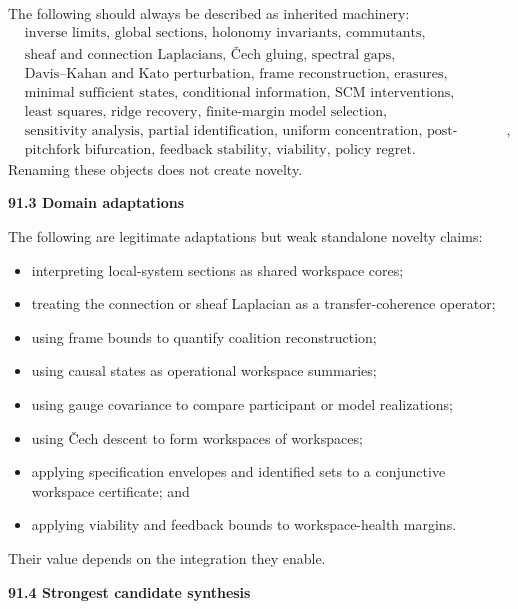 \documentclass[11pt,letterpaper]{article}
\newcommand{\subtopic}[1]{%
 \vspace{0.45em}
 {\bfseries\color{AccentColor} #1\par}
}
\theoremstyle{plain}
\theoremstyle{definition}
\begin{document}
The following should always be described as inherited machinery:
\[
\begin{aligned}
&\text{inverse limits, global sections, holonomy invariants, commutants},\\
&\text{sheaf and connection Laplacians, \v{C}ech gluing, spectral gaps},\\
&\text{Davis--Kahan and Kato perturbation, frame reconstruction, erasures},\\
&\text{minimal sufficient states, conditional information, SCM interventions},\\
&\text{least squares, ridge recovery, finite-margin model selection},\\
&\text{sensitivity analysis, partial identification, uniform concentration, post-selection inference},\\
&\text{pitchfork bifurcation, feedback stability, viability, policy regret}.
\end{aligned}
\]
Renaming these objects does not create novelty.

\subtopic{91.3 Domain adaptations}

The following are legitimate adaptations but weak standalone novelty claims:
\begin{itemize}
\item interpreting local-system sections as shared workspace cores;
\item treating the connection or sheaf Laplacian as a transfer-coherence
 operator;
\item using frame bounds to quantify coalition reconstruction;
\item using causal states as operational workspace summaries;
\item using gauge covariance to compare participant or model realizations;
\item using \v{C}ech descent to form workspaces of workspaces;
\item applying specification envelopes and identified sets to a conjunctive
 workspace certificate; and
\item applying viability and feedback bounds to workspace-health margins.
\end{itemize}
Their value depends on the integration they enable.

\subtopic{91.4 Strongest candidate synthesis}
\end{document}
